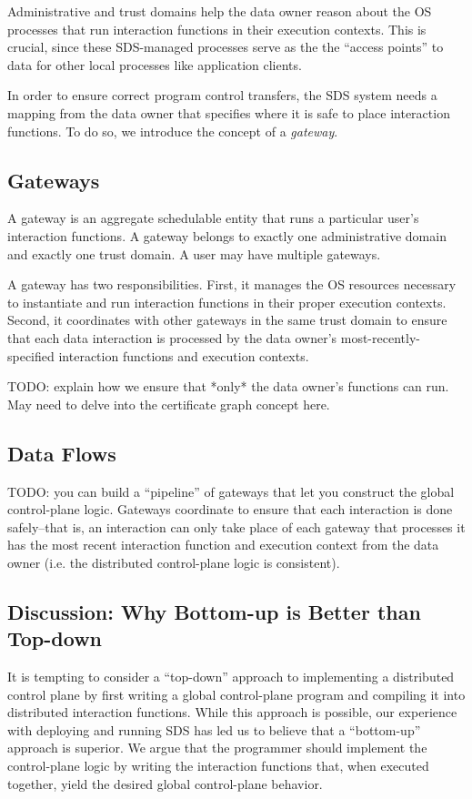 Administrative and trust domains help the data owner reason about the OS processes that
run interaction functions in their execution contexts.  This is crucial, since
these SDS-managed processes serve as the
the ``access points'' to data for other local processes like application
clients.

In order to ensure correct program control transfers, the SDS system
needs a mapping from the
data owner that specifies where it is safe to place interaction functions.
To do so, we introduce the concept of a \emph{gateway}.

\subsection{Gateways}

A gateway is an aggregate schedulable entity that runs a particular user's
interaction functions.  A gateway belongs to exactly one administrative domain
and exactly one trust domain.  A user may have multiple gateways.

A gateway has two responsibilities.  First, it manages the OS resources
necessary to instantiate and run interaction functions in their proper execution
contexts.  Second, it coordinates with other gateways in the same trust domain 
to ensure that each data interaction is processed by the data owner's
most-recently-specified interaction functions and execution contexts.

TODO: explain how we ensure that *only* the data owner's functions can run.  May
need to delve into the certificate graph concept here.

\subsection{Data Flows}

TODO: you can build a ``pipeline'' of gateways that let you construct the global
control-plane logic.  Gateways coordinate to ensure that each interaction is
done safely--that is, an interaction can only take place of each gateway that
processes it has the most recent interaction function and execution context from
the data owner (i.e. the distributed control-plane logic is consistent).

\subsection{Discussion: Why Bottom-up is Better than Top-down}

It is tempting to consider a ``top-down'' approach to implementing a distributed
control plane by first writing a global control-plane program and compiling it into
distributed interaction functions.  While this
approach is possible, our experience with deploying and running SDS 
has led us to believe that a ``bottom-up'' approach is superior.  We argue that
the programmer should implement the control-plane logic by writing the
interaction functions that, when executed together, yield the desired global
control-plane behavior.

